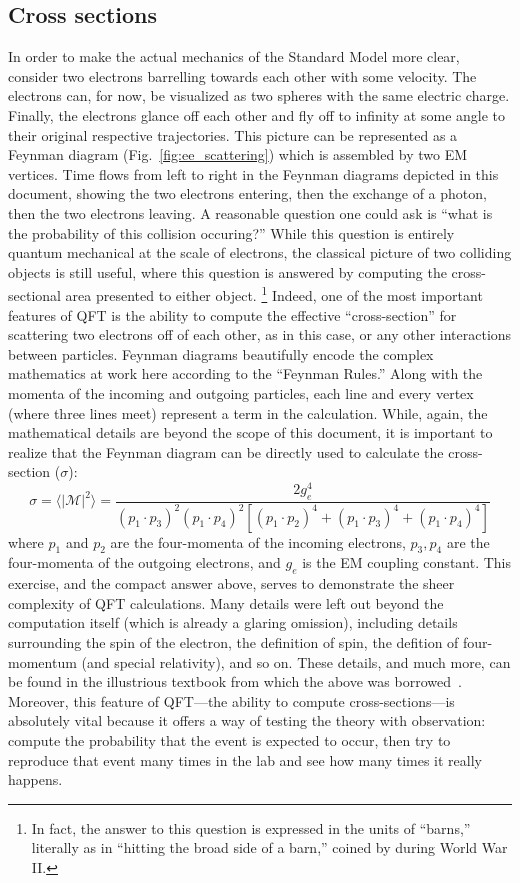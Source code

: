 \subsection{Cross sections}
In order to make the actual mechanics of the Standard Model more clear, consider two electrons barrelling towards each other with some velocity. 
The electrons can, for now, be visualized as two spheres with the same electric charge. 
Finally, the electrons glance off each other and fly off to infinity at some angle to their original respective trajectories. 
This picture can be represented as a Feynman diagram (Fig.~\ref{fig:ee_scattering}) which is assembled by two EM vertices. 
Time flows from left to right in the Feynman diagrams depicted in this document, showing the two electrons entering, then the exchange of a photon, then the two electrons leaving. 
A reasonable question one could ask is ``what is the probability of this collision occuring?''
While this question is entirely quantum mechanical at the scale of electrons, the classical picture of two colliding objects is still useful\footnotemark{}, where this question is answered by computing the cross-sectional area presented to either object. 
\footnote{In fact, the answer to this question is expressed in the units of ``barns,'' literally as in ``hitting the broad side of a barn,'' coined by during World War II.}
Indeed, one of the most important features of QFT is the ability to compute the effective ``cross-section'' for scattering two electrons off of each other, as in this case, or any other interactions between particles. 
Feynman diagrams beautifully encode the complex mathematics at work here according to the ``Feynman Rules.'' 
Along with the momenta of the incoming and outgoing particles, each line and every vertex (where three lines meet) represent a term in the calculation. 
While, again, the mathematical details are beyond the scope of this document, it is important to realize that the Feynman diagram can be directly used to calculate the cross-section ($\sigma$):
\begin{equation}
    \sigma = \langle|\mathcal{M}|^2\rangle = \frac{2g_e^4}{(p_1 \cdot p_3)^2(p_1 \cdot p_4)^2[(p_1 \cdot p_2)^4 + (p_1 \cdot p_3)^4 + (p_1 \cdot p_4)^4]}
\end{equation}
where $p_1$ and $p_2$ are the four-momenta of the incoming electrons, $p_3, p_4$ are the four-momenta of the outgoing electrons, and $g_e$ is the EM coupling constant. 
This exercise, and the compact answer above, serves to demonstrate the sheer complexity of QFT calculations. 
Many details were left out beyond the computation itself (which is already a glaring omission), including details surrounding the spin of the electron, the definition of spin, the defition of four-momentum (and special relativity), and so on. 
These details, and much more, can be found in the illustrious textbook from which the above was borrowed~\cite{Griffiths}. 
Moreover, this feature of QFT---the ability to compute cross-sections---is absolutely vital because it offers a way of testing the theory with observation: compute the probability that the event is expected to occur, then try to reproduce that event many times in the lab and see how many times it really happens. 

